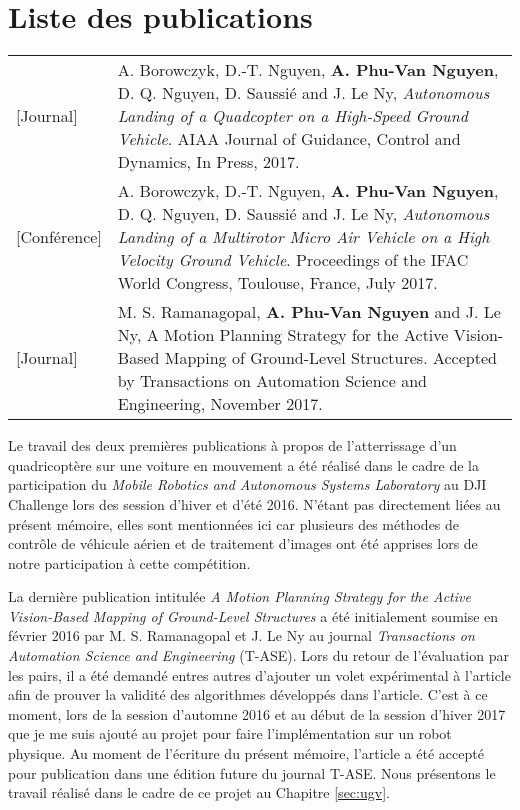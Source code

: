 \chapter*{Liste des publications}

\begin{longtable}{lp{5in}}
  [Journal]     & A. Borowczyk, D.-T. Nguyen, \textbf{A. Phu-Van Nguyen}, D. Q. Nguyen, D. Saussié and J. Le Ny, \textit{Autonomous Landing of a Quadcopter on a High-Speed Ground Vehicle}. AIAA Journal of Guidance, Control and Dynamics, In Press, 2017.\\

  [Conférence]  & A. Borowczyk, D.-T. Nguyen, \textbf{A. Phu-Van Nguyen}, D. Q. Nguyen, D. Saussié and J. Le Ny, \textit{Autonomous Landing of a Multirotor Micro Air Vehicle on a High Velocity Ground Vehicle}. Proceedings of the IFAC World Congress, Toulouse, France, July 2017.\\

  [Journal]      & M. S. Ramanagopal, \textbf{A. Phu-Van Nguyen} and J. Le Ny, A Motion Planning Strategy for the Active Vision-Based Mapping of Ground-Level Structures. Accepted by Transactions on Automation Science and Engineering, November 2017.
\end{longtable}

Le travail des deux premières publications à propos de l'atterrissage d'un quadricoptère sur une voiture en mouvement a été réalisé dans le cadre de la participation du \textit{Mobile Robotics and Autonomous Systems Laboratory} au DJI Challenge lors des session d'hiver et d'été 2016. N'étant pas directement liées au présent mémoire, elles sont mentionnées ici car plusieurs des méthodes de contrôle de véhicule aérien et de traitement d'images ont été apprises lors de notre participation à cette compétition.

La dernière publication intitulée \textit{A Motion Planning Strategy for the Active Vision-Based Mapping of Ground-Level Structures} a été initialement soumise en février 2016 par M. S. Ramanagopal et J. Le Ny au journal \textit{Transactions on Automation Science and Engineering} (T-ASE). Lors du retour de l'évaluation par les pairs, il a été demandé entres autres d'ajouter un volet expérimental à l'article afin de prouver la validité des algorithmes développés dans l'article. C'est à ce moment, lors de la session d'automne 2016 et au début de la session d'hiver 2017 que je me suis ajouté au projet pour faire l'implémentation sur un robot physique. Au moment de l'écriture du présent mémoire, l'article a été accepté pour publication dans une édition future du journal T-ASE. Nous présentons le travail réalisé dans le cadre de ce projet au Chapitre \ref{sec:ugv}.
